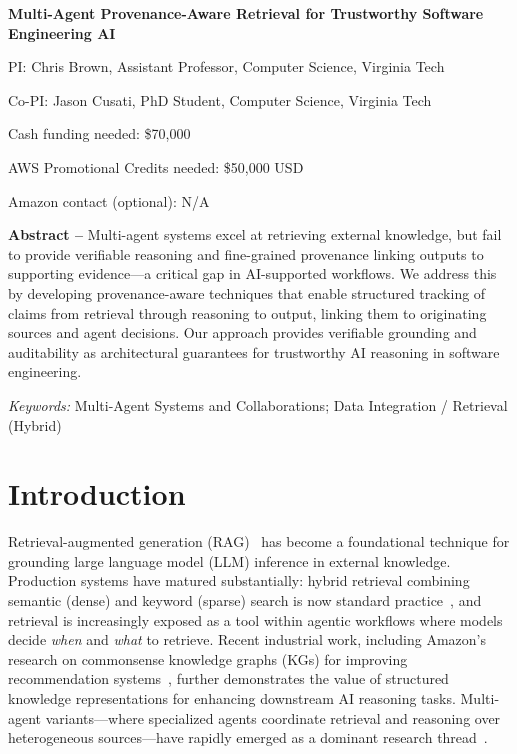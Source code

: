 \documentclass[11pt]{proposalnsf}
\begin{document}
\begin{center}
 \textbf{Multi-Agent Provenance-Aware Retrieval for Trustworthy Software Engineering AI}    
\end{center}



\noindent
PI: Chris Brown, Assistant Professor, Computer Science, Virginia Tech \vspace{2pt}

\noindent
Co-PI: Jason Cusati, PhD Student, Computer Science, Virginia Tech \vspace{2pt}


\noindent
Cash funding needed: \$70,000 \vspace{2pt}

\noindent
AWS Promotional Credits needed: \$50,000 USD \vspace{2pt}

\noindent
Amazon contact (optional): N/A \vspace{2pt}


\noindent
\textbf{Abstract –} Multi-agent systems excel at retrieving external knowledge, but fail to provide verifiable reasoning and fine-grained provenance linking outputs to supporting evidence—a critical gap in AI-supported workflows. We address this by developing provenance-aware techniques that enable structured tracking of claims from retrieval through reasoning to output, linking them to originating sources and agent decisions. Our approach provides verifiable grounding and auditability as architectural guarantees for trustworthy AI reasoning in software engineering.

\noindent\textit{Keywords:} Multi-Agent Systems and Collaborations; Data Integration / Retrieval (Hybrid)

\section*{\normalsize Introduction}

Retrieval-augmented generation (RAG)~\cite{Lewis2020RAG} has become a foundational technique for grounding large language model (LLM) inference in external knowledge. Production systems have matured substantially: hybrid retrieval combining semantic (dense) and keyword (sparse) search is now standard practice~\cite{AWSBedrockHybridSearch2024}, and retrieval is increasingly exposed as a tool within agentic workflows where models decide \textit{when} and \textit{what} to retrieve. Recent industrial work, including Amazon's research on commonsense knowledge graphs (KGs) for improving recommendation systems~\cite{Yu2024COSMO}, further demonstrates the value of structured knowledge representations for enhancing downstream AI reasoning tasks. Multi-agent variants—where specialized agents coordinate retrieval and reasoning over heterogeneous sources—have rapidly emerged as a dominant research thread~\cite{Singh2025AgenticRAGSurvey,Wu2025ToG3,Dong2025YoutuGraphRAG}.
\end{document}
